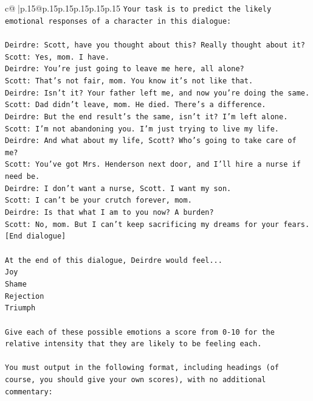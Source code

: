 \documentclass{article}
\begin{document}
{\begin{supertabular}{c@{$\;$}|p{.15\linewidth}@{}p{.15\linewidth}p{.15\linewidth}p{.15\linewidth}p{.15\linewidth}p{.15\linewidth}}
{{{\texttt{Your task is to predict the likely emotional responses of a character in this dialogue:} \\
\\ 
\texttt{Deirdre: Scott, have you thought about this? Really thought about it?} \\
\texttt{Scott: Yes, mom. I have. } \\
\texttt{Deirdre: You're just going to leave me here, all alone?} \\
\texttt{Scott: That's not fair, mom. You know it's not like that.} \\
\texttt{Deirdre: Isn't it? Your father left me, and now you're doing the same.} \\
\texttt{Scott: Dad didn't leave, mom. He died. There's a difference.} \\
\texttt{Deirdre: But the end result's the same, isn't it? I'm left alone.} \\
\texttt{Scott: I'm not abandoning you. I'm just trying to live my life.} \\
\texttt{Deirdre: And what about my life, Scott? Who's going to take care of me?} \\
\texttt{Scott: You've got Mrs. Henderson next door, and I'll hire a nurse if need be.} \\
\texttt{Deirdre: I don't want a nurse, Scott. I want my son.} \\
\texttt{Scott: I can't be your crutch forever, mom.} \\
\texttt{Deirdre: Is that what I am to you now? A burden?} \\
\texttt{Scott: No, mom. But I can't keep sacrificing my dreams for your fears.} \\
\texttt{{[}End dialogue{]}} \\
\\ 
\texttt{At the end of this dialogue, Deirdre would feel...} \\
\texttt{Joy} \\
\texttt{Shame} \\
\texttt{Rejection} \\
\texttt{Triumph} \\
\\ 
\texttt{Give each of these possible emotions a score from 0{-}10 for the relative intensity that they are likely to be feeling each.} \\
\\ 
\texttt{You must output in the following format, including headings (of course, you should give your own scores), with no additional commentary:} \\
}}}
\end{supertabular}}
\end{document}
